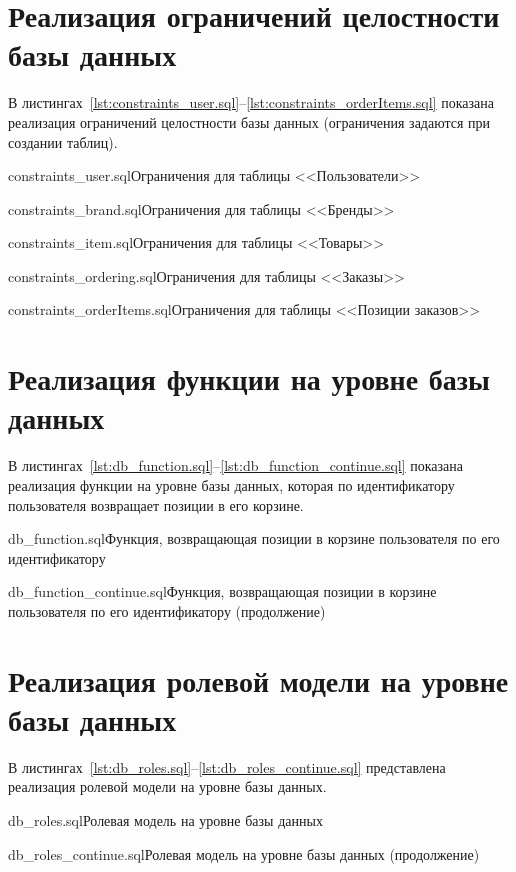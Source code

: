 \documentclass{bmstu}
\begin{document}
\section{Реализация ограничений целостности базы данных}

В листингах~\ref{lst:constraints_user.sql}--\ref{lst:constraints_orderItems.sql} показана реализация ограничений целостности базы данных (ограничения задаются при создании таблиц).

{constraints_user.sql}{Ограничения для таблицы <<Пользователи>>}

\pagebreak

{constraints_brand.sql}{Ограничения для таблицы <<Бренды>>}

{constraints_item.sql}{Ограничения для таблицы <<Товары>>}

{constraints_ordering.sql}{Ограничения для таблицы <<Заказы>>}

\pagebreak

{constraints_orderItems.sql}{Ограничения для таблицы <<Позиции заказов>>}

\section{Реализация функции на уровне базы данных}

В листингах~\ref{lst:db_function.sql}--\ref{lst:db_function_continue.sql} показана реализация функции на уровне базы данных, которая по идентификатору пользователя возвращает позиции в его корзине. 

{db_function.sql}{Функция, возвращающая позиции в корзине пользователя по его идентификатору}

{db_function_continue.sql}{Функция, возвращающая позиции в корзине пользователя по его идентификатору (продолжение)}

\section{Реализация ролевой модели на уровне базы данных}

В листингах~\ref{lst:db_roles.sql}--\ref{lst:db_roles_continue.sql} представлена реализация ролевой модели на уровне базы данных.

{db_roles.sql}{Ролевая модель на уровне базы данных}

\pagebreak

{db_roles_continue.sql}{Ролевая модель на уровне базы данных (продолжение)}
\end{document}
